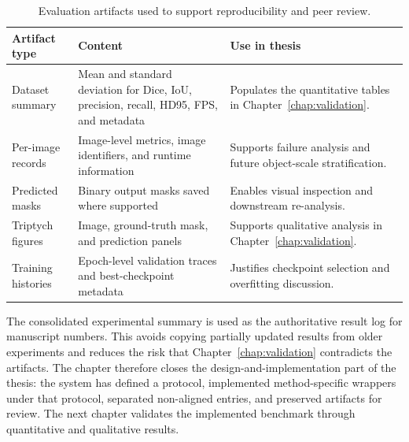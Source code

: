 \begin{table}[H]
\centering
\caption{Evaluation artifacts used to support reproducibility and peer review.}
\label{tab:evaluation-artifacts-ch4}
\begin{tabular}{p{3.4cm}p{6.2cm}p{4.0cm}}
\toprule
\textbf{Artifact type} & \textbf{Content} & \textbf{Use in thesis} \\
\midrule
Dataset summary & Mean and standard deviation for Dice, IoU, precision, recall, HD95, FPS, and metadata & Populates the quantitative tables in Chapter~\ref{chap:validation}. \\
Per-image records & Image-level metrics, image identifiers, and runtime information & Supports failure analysis and future object-scale stratification. \\
Predicted masks & Binary output masks saved where supported & Enables visual inspection and downstream re-analysis. \\
Triptych figures & Image, ground-truth mask, and prediction panels & Supports qualitative analysis in Chapter~\ref{chap:validation}. \\
Training histories & Epoch-level validation traces and best-checkpoint metadata & Justifies checkpoint selection and overfitting discussion. \\
\bottomrule
\end{tabular}
\end{table}

The consolidated experimental summary is used as the authoritative result log for manuscript numbers. This avoids copying partially updated results from older experiments and reduces the risk that Chapter~\ref{chap:validation} contradicts the artifacts. The chapter therefore closes the design-and-implementation part of the thesis: the system has defined a protocol, implemented method-specific wrappers under that protocol, separated non-aligned entries, and preserved artifacts for review. The next chapter validates the implemented benchmark through quantitative and qualitative results.
